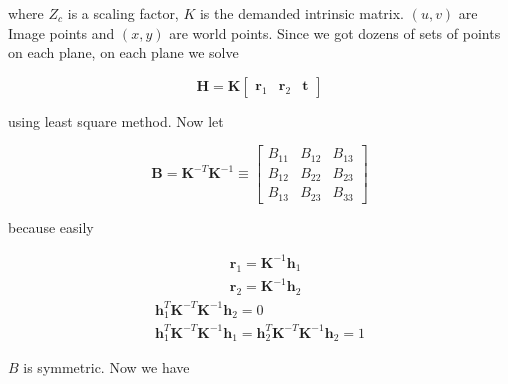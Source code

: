 \documentclass{article}
\theoremstyle{definition}
\begin{document}
	where $Z_c$ is a scaling factor, $K$ is the demanded intrinsic matrix. $(u, v)$ are Image points and $(x, y)$ are world points. Since we got dozens of sets of points on each plane, on each plane we solve 
	
	\begin{equation}
		\mathbf H = \mathbf{K}\left[\begin{array}{lll}
			\mathbf{r}_1 & \mathbf{r}_2 & \mathbf{t}
		\end{array}\right]
	\end{equation}

	using least square method. Now let
	
	\begin{equation}
		\mathbf{B}=\mathbf{K}^{-T} \mathbf{K}^{-1} \equiv\left[\begin{array}{lll}
			B_{11} & B_{12} & B_{13} \\
			B_{12} & B_{22} & B_{23} \\
			B_{13} & B_{23} & B_{33}
		\end{array}\right]
	\end{equation}

	because easily
	
	\begin{equation}
	\begin{aligned}
		& \mathbf{r}_1=\mathbf{K}^{-1} \mathbf{h}_1 \\
		& \mathbf{r}_2=\mathbf{K}^{-1} \mathbf{h}_2
	\end{aligned}
	\end{equation}
	\begin{equation}
	\begin{gathered}
		\mathbf{h}_1^T \mathbf{K}^{-T} \mathbf{K}^{-1} \mathbf{h}_2=0 \\
		\mathbf{h}_1^T \mathbf{K}^{-T} \mathbf{K}^{-1} \mathbf{h}_1=\mathbf{h}_2^T \mathbf{K}^{-T} \mathbf{K}^{-1} \mathbf{h}_2=1
	\end{gathered}
	\end{equation}

	$B$ is symmetric. Now we have 
	
\end{document}
